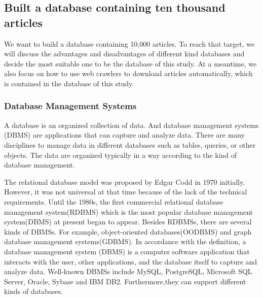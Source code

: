 
\subsection{Built a database containing ten thousand articles}

We want to build a database containing 10,000 articles.
To reach that target, we will discuss the advantages and disadvantages of different kind databases and decide the most suitable one to be the database of this study.
At a meantime, we also focus on how to use web crawlers to download articles automatically, which is contained in the database of this study.

\subsubsection{Database Management Systems}

A database is an organized collection of data.
And database management systems (DBMS) are applications that can capture and analyze data.
There are many disciplines to manage data in different databases such as tables, queries, or other objects. 
The data are organized typically in a way according to the kind of database management. 

The relational database model was proposed by Edgar Codd in 1970 initially.
However, it was not universal at that time because of the lack of the technical requirements.
Until the 1980s, the first commercial relational database management system(RDBMS) which is the most popular database management system(DBMS) at present began to appear.
Besides RDBMSs, there are several kinds of DBMSs.
For example, object-oriented databases(OODBMS) and graph database management systems(GDBMS).
In accordance with the definition, a database management system (DBMS) is a computer software application that interacts with the user, other applications, and the database itself to capture and analyze data.
Well-known DBMSs include MySQL, PostgreSQL, Microsoft SQL Server, Oracle, Sybase and IBM DB2.
Furthermore,they can support different kinds of databases.




